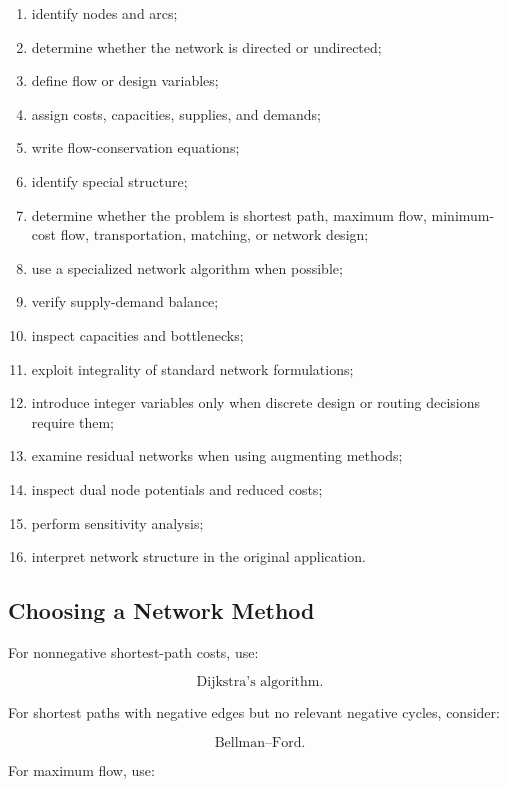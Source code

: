 \begin{enumerate}
    \item identify nodes and arcs;
    \item determine whether the network is directed or undirected;
    \item define flow or design variables;
    \item assign costs, capacities, supplies, and demands;
    \item write flow-conservation equations;
    \item identify special structure;
    \item determine whether the problem is shortest path, maximum flow,
          minimum-cost flow, transportation, matching, or network design;
    \item use a specialized network algorithm when possible;
    \item verify supply-demand balance;
    \item inspect capacities and bottlenecks;
    \item exploit integrality of standard network formulations;
    \item introduce integer variables only when discrete design or routing
          decisions require them;
    \item examine residual networks when using augmenting methods;
    \item inspect dual node potentials and reduced costs;
    \item perform sensitivity analysis;
    \item interpret network structure in the original application.
\end{enumerate}

\subsection{Choosing a Network Method}
\label{subsec:choosing-network-method}

For nonnegative shortest-path costs, use:

\[
\boxed{
\text{Dijkstra's algorithm}.
}
\]

For shortest paths with negative edges but no relevant negative cycles,
consider:

\[
\boxed{
\text{Bellman--Ford}.
}
\]

For maximum flow, use:

